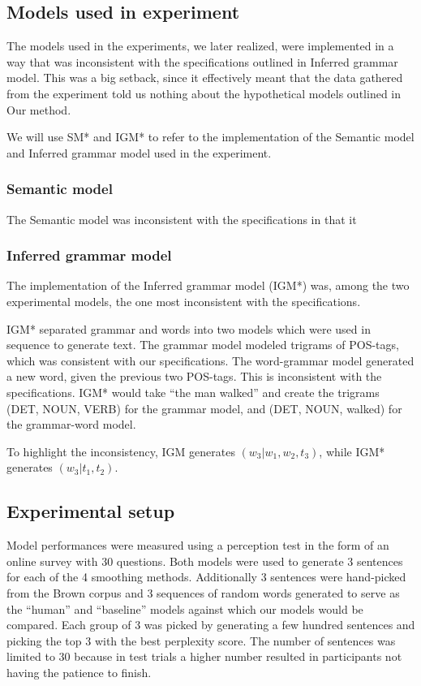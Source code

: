 \documentclass[ai15_group61_report.tex]{subfiles}
\begin{document}
\subsection{Models used in experiment}
The models used in the experiments, we later realized, were implemented in a way that was inconsistent with the specifications outlined in {Inferred grammar model}. This was a big setback, since it effectively meant that the data gathered from the experiment told us nothing about the hypothetical models outlined in {Our method}.

We will use SM* and IGM* to refer to the implementation of the Semantic model and Inferred grammar model used in the experiment.

\subsubsection{Semantic model}
The Semantic model was inconsistent with the specifications in that it 


\subsubsection{Inferred grammar model}
The implementation of the Inferred grammar model (IGM*) was, among the two experimental models, the one most inconsistent with the specifications. 

IGM* separated grammar and words into two models which were used in sequence to generate text. The grammar model modeled trigrams of POS-tags, which was consistent with our specifications. The word-grammar model generated a new word, given the previous two POS-tags. This is inconsistent with the specifications. IGM* would take ``the man walked'' and create the trigrams (DET, NOUN, VERB) for the grammar model, and (DET, NOUN, walked) for the grammar-word model.

To highlight the inconsistency, IGM generates $(w_3|w_1,w_2,t_3)$, while IGM* generates $(w_3 | t_1,t_2)$.


\subsection{Experimental setup}
\label{sec:expiremental_setup}
Model performances were measured using a perception test in the form of an online survey with 30 questions. Both models were used to generate 3 sentences for each of the 4 smoothing methods.  Additionally 3 sentences were hand-picked from the Brown corpus and 3 sequences of random words generated to serve as the ``human'' and ``baseline'' models against which our models would be compared. Each group of 3 was picked by generating a few hundred sentences and picking the top 3 with the best perplexity score. The number of sentences was limited to 30 because in test trials a higher number resulted in participants not having the patience to finish. 
\end{document}
